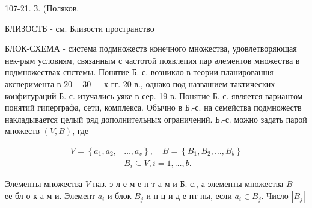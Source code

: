 \documentclass[10pt]{article}
\begin{document}
107-21. З. (Поляков.



БЛИЗОСТБ - см. Близости пространство



БЛОК-СХЕМА - система подмножеств конечного множества, удовлетворяющая нек-рым условиям, связанным с частотой появлепия пар әлементов множества в подмножествах спстемы. Понятие Б.-с. возникло в теории планированшя әксперимента в $20-30-$ х гг. 20 в., однако под назвашием тактических конфигураций Б.-с. изучались уяке в сер. 19 в. Понятие Б.-с. является вариантом понятий гиперграфа, сети, комплекса. Обычно в Б.-с. на семейства подмножеств накладывается целый ряд дополнительных ограничений. Б.-с. можно задать парой множеств $(V, B)$, где



\[

\begin{aligned}

V=\left\{a_{1}, a_{2},\right. & \left.\ldots, a_{v}\right\}, \quad B=\left\{B_{1}, B_{2}, \ldots, B_{b}\right\} \\

& B_{i} \subseteq V, i=1, \ldots, b .

\end{aligned}

\]



Элементы множества $V$ наз. э л е м е н т а м и Б.-с., а элементы множества $B$ - ее бл о к а м и. Элемент $a_{i}$ и блок $B_{j}$ и н ц и д е нт ны, если $a_{i} \in B_{j}$. Число $\left|B_{j}\right|$
\end{document}
